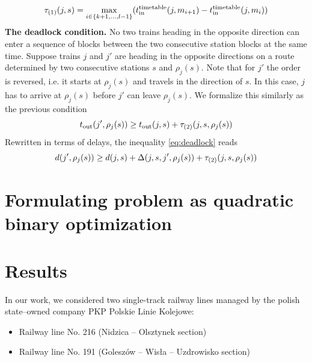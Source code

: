 \begin{equation}
\tau_{(1)}(j, s) = \max_{i \in \{k+1,\ldots,l-1\}}(t_\text{in}^\text{timetable}(j, m_{i+1}) - t_\text{in}^\text{timetable}(j, m_i))
\end{equation}
\textbf{The deadlock condition.} No two trains heading in the opposite direction can enter
a sequence of blocks between the two consecutive station blocks at the same time. Suppose trains $j$
and $j'$ are heading in the opposite directions on a route determined by two consecutive stations
$s$ and $\rho_j(s)$. Note that for $j'$ the order is reversed, i.e. it starts at $\rho_j(s)$ and
travels in the direction of $s$. In this case, $j$ has to arrive at $\rho_j(s)$ before $j'$ can
leave $\rho_j(s)$. We formalize this similarly as the previous condition
\begin{equation}
\label{eq:deadlock}
t_\text{out}(j', \rho_j(s)) \ge t_\text{out}(j,s) + \tau_{(2)}(j, s, \rho_j(s))
\end{equation}
Rewritten in terms of delays, the inequality \eqref{eq:deadlock} reads
\begin{equation}
d(j',\rho_j(s)) \ge d(j, s) + \Delta(j,s,j',\rho_j(s)) + \tau_{(2)}(j, s, \rho_j(s))
\end{equation}
\section{Formulating problem as quadratic binary optimization}


\section{Results}
In our work, we considered two single-track railway lines managed by the polish state--owned company
PKP Polskie Linie Kolejowe:

\begin{itemize}
    \item Railway line No. 216 (Nidzica -- Olsztynek section)
    \item Railway line No. 191 (Goleszów -- Wisła -- Uzdrowisko section)
\end{itemize}
